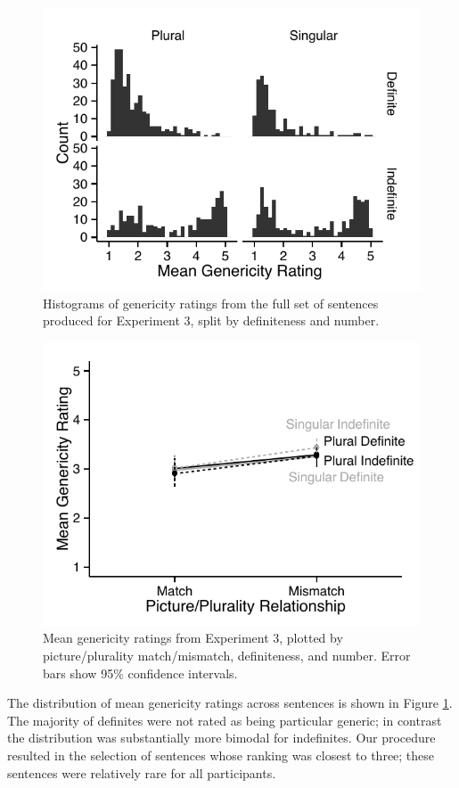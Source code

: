 \documentclass[10pt,letterpaper]{article}
\begin{document}
\begin{figure}[t]
\centering
\includegraphics[width=.9\linewidth]{figures/e3_norming_mod.pdf}
\caption{\label{fig:e3norming} Histograms of genericity ratings from the full set of sentences produced for Experiment 3, split by definiteness and number.} 
\end{figure}

\begin{figure}[t]
\centering
\includegraphics[width=.9\linewidth]{figures/e3_mod.pdf}
\caption{\label{fig:e3} Mean genericity ratings from Experiment 3, plotted by picture/plurality match/mismatch, definiteness, and number. Error bars show 95\% confidence intervals.} 
\end{figure}

The distribution of mean genericity ratings across sentences is shown in Figure \ref{fig:e3norming}. The majority of definites were not rated as being particular generic; in contrast the distribution was substantially more bimodal for indefinites. Our procedure resulted in the selection of sentences whose ranking was closest to three; these sentences were relatively rare for all participants.
\end{document}

